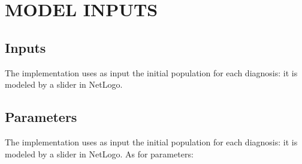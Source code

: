 \section{MODEL INPUTS}\label{sec:data}
\subsection{Inputs}
The implementation uses as input the initial population for each diagnosis: it is modeled by a slider in NetLogo.

\subsection{Parameters}

The implementation uses as input the initial population for each diagnosis: it is modeled by a slider in NetLogo. As for parameters:
